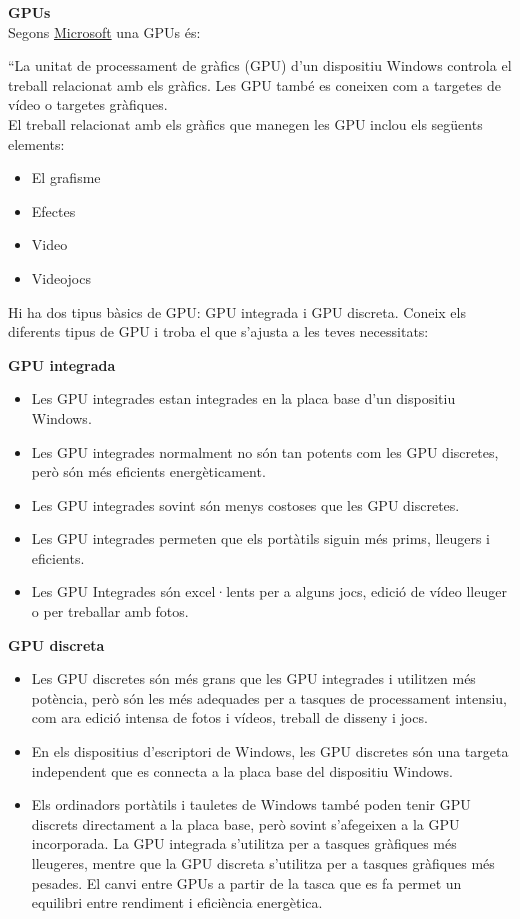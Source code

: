 \textbf{\Large GPUs}\label{GPUs}\\
Segons \href{https://support.microsoft.com/es-es/windows/todo-sobre-las-unidades-de-procesamiento-gr%C3%A1fico-gpu-e159bedb-80b7-4738-a0c1-76d2a05beab4}{Microsoft} una GPUs és:\\
  {\color{gray}``La unitat de processament de gràfics (GPU) d'un dispositiu Windows controla el treball relacionat amb els gràfics. Les GPU també es coneixen com a targetes de vídeo o targetes gràfiques.\\
  El treball relacionat amb els gràfics que manegen les GPU inclou els següents elements:
  \begin{itemize}
   \item El grafisme
   \item Efectes
   \item Video
   \item Videojocs
  \end{itemize}
  Hi ha dos tipus bàsics de GPU: GPU integrada i GPU discreta. Coneix els diferents tipus de GPU i troba el que s'ajusta a les teves necessitats:

  \textbf{GPU integrada}
  \begin{itemize}
   \item Les GPU integrades estan integrades en la placa base d'un dispositiu Windows.
   \item Les GPU integrades normalment no són tan potents com les GPU discretes, però són més eficients energèticament.
   \item Les GPU integrades sovint són menys costoses que les GPU discretes.
   \item Les GPU integrades permeten que els portàtils siguin més prims, lleugers i eficients.
   \item Les GPU Integrades són excel·lents per a alguns jocs, edició de vídeo lleuger o per treballar amb fotos.
  \end{itemize}

  \textbf{GPU discreta}
  \begin{itemize}
   \item Les GPU discretes són més grans que les GPU integrades i utilitzen més potència, però són les més adequades per a tasques de processament intensiu, com ara edició intensa de fotos i vídeos, treball de disseny i jocs.
   \item En els dispositius d'escriptori de Windows, les GPU discretes són una targeta independent que es connecta a la placa base del dispositiu Windows.
   \item Els ordinadors portàtils i tauletes de Windows també poden tenir GPU discrets directament a la placa base, però sovint s'afegeixen a la GPU incorporada. La GPU integrada s'utilitza per a tasques gràfiques més lleugeres, mentre que la GPU discreta s'utilitza per a tasques gràfiques més pesades. El canvi entre GPUs a partir de la tasca que es fa permet un equilibri entre rendiment i eficiència energètica.


\end{itemize}}
